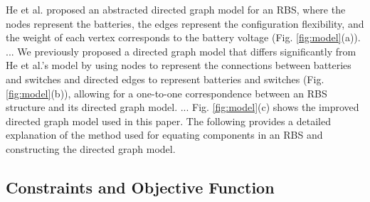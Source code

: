 \documentclass[a4paper]{article}
\begin{document}

He et al. \cite{heExploringAdaptiveReconfiguration2013} proposed an abstracted directed graph model for an RBS, where the nodes represent the batteries, the edges represent the configuration flexibility, and the weight of each vertex corresponds to the battery voltage (Fig. \ref{fig:model}(a)). 
...
We previously proposed a directed graph model that differs significantly from He et al.'s model by using nodes to represent the connections between batteries and switches and directed edges to represent batteries and switches (Fig. \ref{fig:model}(b)), allowing for a one-to-one correspondence between an RBS structure and its directed graph model. 
...
Fig. \ref{fig:model}(c) shows the improved directed graph model used in this paper.
The following provides a detailed explanation of the method used for equating components in an RBS and constructing the directed graph model.


\subsection{Constraints and Objective Function}
\end{document}
